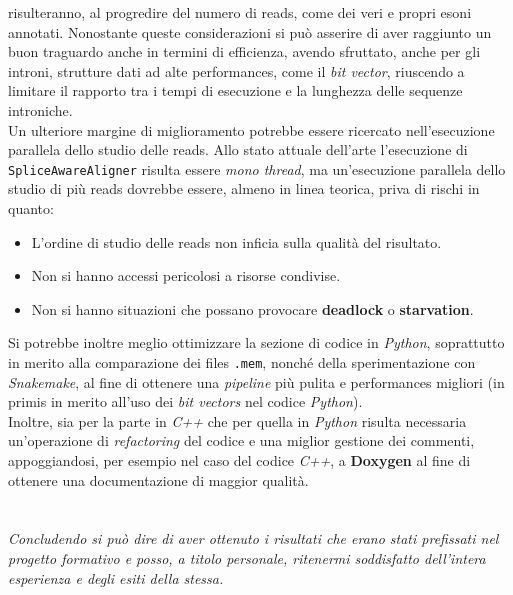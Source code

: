 \documentclass[a4paper,12pt, oneside]{book}
\begin{document}
risulteranno, al progredire del numero di reads, come dei veri e propri esoni
annotati. Nonostante queste considerazioni si può asserire di aver raggiunto
un buon traguardo anche in termini di efficienza, avendo sfruttato, anche per
gli introni, strutture dati ad alte performances, come il \textit{bit vector},
riuscendo a limitare il rapporto tra i tempi di esecuzione e la lunghezza delle
sequenze introniche.\\
Un ulteriore margine di miglioramento potrebbe essere ricercato nell'esecuzione
parallela dello studio delle reads. Allo stato attuale dell'arte l'esecuzione di
\texttt{SpliceAwareAligner} risulta essere \textit{mono thread}, ma un'esecuzione
parallela dello studio di più reads dovrebbe essere, almeno in linea teorica,
priva di rischi in quanto:
\begin{itemize}
  \item L'ordine di studio delle reads non inficia sulla qualità del risultato.
  \item Non si hanno accessi pericolosi a risorse condivise.
  \item Non si hanno situazioni che possano provocare \textbf{deadlock} o
  \textbf{starvation}.
\end{itemize}
Si potrebbe inoltre meglio ottimizzare la sezione di codice in \textit{Python},
soprattutto in merito alla comparazione dei files \texttt{.mem},
nonché della sperimentazione con \textit{Snakemake}, al fine di ottenere una
\textit{pipeline} più pulita e performances migliori (in primis in merito
all'uso dei \textit{bit vectors} nel codice \textit{Python}).\\
Inoltre, sia per la parte in \textit{C++} che per quella in \textit{Python}
risulta necessaria un'operazione di \textit{refactoring} del codice e una
miglior gestione dei commenti, appoggiandosi, per esempio nel caso del codice
\textit{C++}, a \textbf{Doxygen} \cite{doc} al fine di ottenere una
documentazione di maggior qualità.\\
\\
\\
\textit{Concludendo si può dire di aver ottenuto i risultati che erano stati
  prefissati nel progetto formativo e posso, a titolo personale, ritenermi
  soddisfatto dell'intera esperienza e degli esiti della stessa.}


\printbibliography[title={Bibliografia e sitografia}]
\end{document}
